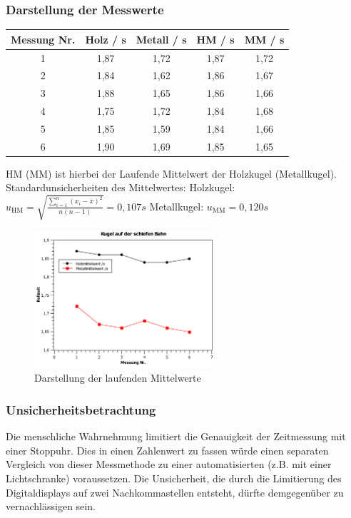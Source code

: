 \documentclass[
	a4paper,
	12pt,
	pagesize,
	ngerman
]{scrartcl}
\begin{document}
	\subsubsection{Darstellung der Messwerte}
	
	\begin{tabular}{| c | c | c | c | c |} \hline
		Messung Nr. & Holz  / \si{s} & Metall  / \si{s} & HM  / \si{s} & MM  / \si{s}\\ \hline
		1 & 1,87&1,72&1,87&1,72\\
		2 & 1,84&1,62&1,86&1,67\\
		3 & 1,88&1,65&1,86&1,66\\
		4 & 1,75&1,72&1,84&1,68\\
		5 & 1,85&1,59&1,84&1,66\\
		6 & 1,90&1,69&1,85&1,65\\
		\hline
	\end{tabular}
	\newline
	HM (MM) ist hierbei der Laufende Mittelwert der Holzkugel (Metallkugel). \newline
	Standardunsicherheiten des Mittelwertes: \newline
	Holzkugel: $u_\text{HM}=\sqrt{\frac{\sum_{i=1}^{n} (x_i-\overline{x})^2}{n(n-1)}}=0,107 \si{s}$ \newline
	Metallkugel: $u_\text{MM}=0,120\si{s}$
	
	\begin{figure}[htb]
	  \centering
	    \includegraphics[width=0.6\textwidth]{Kugel_auf_schiefer_Bahn} %
	  \caption{Darstellung der laufenden Mittelwerte}
	\end{figure}
	\subsubsection{Unsicherheitsbetrachtung}
	Die menschliche Wahrnehmung limitiert die Genauigkeit der Zeitmessung mit einer Stoppuhr. Dies in einen Zahlenwert zu fassen würde einen separaten Vergleich von dieser Messmethode zu einer automatisierten (z.B. mit einer Lichtschranke) voraussetzen. Die Unsicherheit, die durch die Limitierung des Digitaldisplays auf zwei Nachkommastellen entsteht, dürfte demgegenüber zu vernachlässigen sein.
\end{document}
